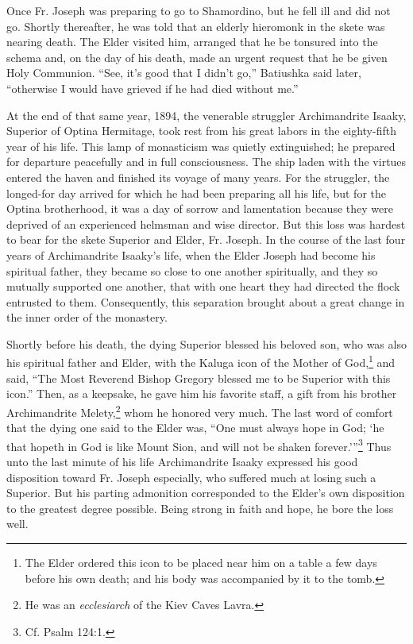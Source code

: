 Once Fr. Joseph was preparing to go to Shamordino, but he fell ill and did not go. Shortly thereafter, he was told that an elderly hieromonk in the skete was nearing death. The Elder visited him, arranged that he be tonsured into the schema and, on the day of his death, made an urgent request that he be given Holy Communion. ``See, it's good that I didn't go,'' Batiushka said later, ``otherwise I would have grieved if he had died without me.''

At the end of that same year, 1894, the venerable struggler Archimandrite Isaaky, Superior of Optina Hermitage, took rest from his great labors in the eighty-fifth year of his life. This lamp of monasticism was quietly extinguished; he prepared for departure peacefully and in full consciousness. The ship laden with the virtues entered the haven and finished its voyage of many years. For the struggler, the longed-for day arrived for which he had been preparing all his life, but for the Optina brotherhood, it was a day of sorrow and lamentation because they were deprived of an experienced helmsman and wise director. But this loss was hardest to bear for the skete Superior and Elder, Fr. Joseph. In the course of the last four years of Archimandrite Isaaky's life, when the Elder Joseph had become his spiritual father, they became so close to one another spiritually, and they so mutually supported one another, that with one heart they had directed the flock entrusted to them. Consequently, this separation brought about a great change in the inner order of the monastery.

Shortly before his death, the dying Superior blessed his beloved son, who was also his spiritual father and Elder, with the Kaluga icon of the Mother of God,\footnote{The Elder ordered this icon to be placed near him on a table a few days before his own death; and his body was accompanied by it to the tomb.} and said, ``The Most Reverend Bishop Gregory blessed me to be Superior with this icon.'' Then, as a keepsake, he gave him his favorite staff, a gift from his brother Archimandrite Melety,\footnote{He was an \textit{ecclesiarch} of the Kiev Caves Lavra.} whom he honored very much. The last word of comfort that the dying one said to the Elder was, ``One must always hope in God; `he that hopeth in God is like Mount Sion, and will not be shaken forever.'''\footnote{Cf. Psalm 124:1.} Thus unto the last minute of his life Archimandrite Isaaky expressed his good disposition toward Fr. Joseph especially, who suffered much at losing such a Superior. But his parting admonition corresponded to the Elder's own disposition to the greatest degree possible. Being strong in faith and hope, he bore the loss well.

